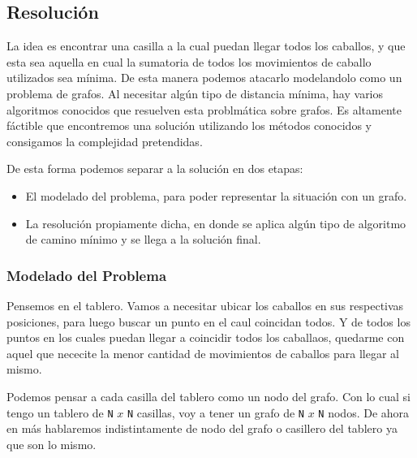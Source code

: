 \subsection{Resoluci\'on}

La idea es encontrar una casilla a la cual puedan llegar todos los caballos, y que esta sea aquella en cual la sumatoria de todos los movimientos de caballo utilizados sea m\'inima.
De esta manera podemos atacarlo modelandolo como un problema de grafos. Al necesitar alg\'un tipo de distancia m\'inima, hay varios algoritmos conocidos que resuelven esta problm\'atica sobre grafos. Es altamente f\'actible que encontremos una soluci\'on utilizando los m\'etodos conocidos y consigamos la complejidad pretendidas.

De esta forma podemos separar a la soluci\'on en dos etapas:
\begin{itemize}
	\item El modelado del problema, para poder representar la situaci\'on con un grafo.
	\item La resoluci\'on propiamente dicha, en donde se aplica alg\'un tipo de algoritmo de camino m\'inimo y se llega a la soluci\'on final.
\end{itemize}

\subsubsection{Modelado del Problema}

Pensemos en el tablero. Vamos a necesitar ubicar los caballos en sus respectivas posiciones, para luego buscar un punto en el caul coincidan todos. Y de todos los puntos en los cuales puedan llegar a coincidir todos los caballaos, quedarme con aquel que nececite la menor cantidad de movimientos de caballos para llegar al mismo.

Podemos pensar a cada casilla del tablero como un nodo del grafo. Con lo cual si tengo un tablero de \texttt{N} $x$ \texttt{N} casillas, voy a tener un grafo de \texttt{N} $x$ \texttt{N} nodos. De ahora en m\'as hablaremos indistintamente de nodo del grafo o casillero del tablero ya que son lo mismo.

